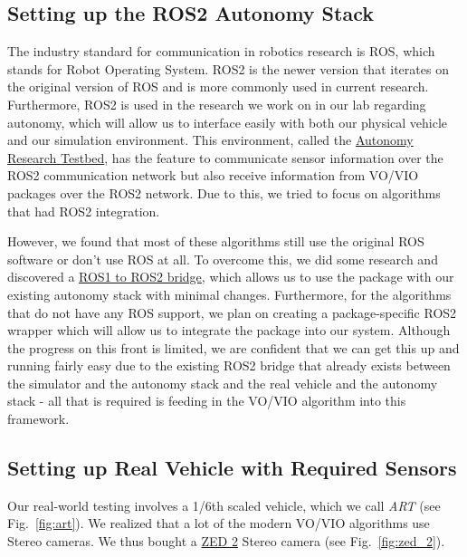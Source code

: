 \documentclass{article}
\begin{document}
\subsection{Setting up the ROS2 Autonomy Stack}
The industry standard for communication in robotics research is ROS, which stands for Robot Operating System. ROS2 is the newer version that iterates on the original version of ROS and is more commonly used in current research. Furthermore, ROS2 is used in the research we work on in our lab regarding autonomy, which will allow us to interface easily with both our physical vehicle and our simulation environment. This environment, called the \href{https://github.com/uwsbel/autonomy-research-testbed}{Autonomy Research Testbed}, has the feature to communicate sensor information over the ROS2 communication network but also receive information from VO/VIO packages over the ROS2 network. Due to this, we tried to focus on algorithms that had ROS2 integration.  

However, we found that most of these algorithms still use the original ROS software or don't use ROS at all. To overcome this, we did some research and discovered a \href{https://github.com/ros2/ros1_bridge}{ROS1 to ROS2 bridge}, which allows us to use the package with our existing autonomy stack with minimal changes. Furthermore, for the algorithms that do not have any ROS support, we plan on creating a package-specific ROS2 wrapper which will allow us to integrate the package into our system. Although the progress on this front is limited, we are confident that we can get this up and running fairly easy due to the existing ROS2 bridge that already exists between the simulator and the autonomy stack and the real vehicle and the autonomy stack - all that is required is feeding in the VO/VIO algorithm into this framework.

\subsection{Setting up Real Vehicle with Required Sensors}
Our real-world testing involves a 1/6th scaled vehicle, which we call \textit{ART} (see Fig.~\ref{fig:art}). We realized that a lot of the modern VO/VIO algorithms use Stereo cameras. We thus bought a \href{https://www.stereolabs.com/products/zed-2}{ZED 2} Stereo camera (see Fig.~\ref{fig:zed_2}). 
\end{document}
